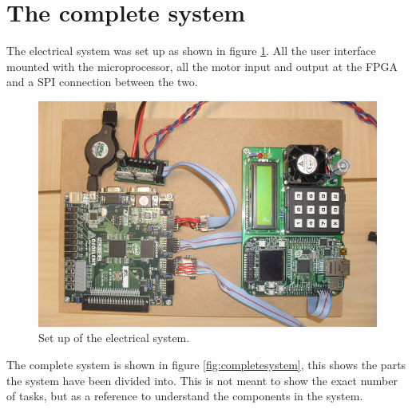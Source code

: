 \section{The complete system}

The electrical system was set up as shown in figure \ref{fig:digitalsystem}. All the user interface mounted with the microprocessor, all the motor input and output at the FPGA and a SPI connection between the two.

\begin{figure}[htb]
	\centering
	\includegraphics[scale=1,trim=0 0 0 0]{graphics/digitalsystem.png} %
	\caption{Set up of the electrical system.}
	\label{fig:digitalsystem}			%
\end{figure}


The complete system is shown in figure \ref{fig:completesystem}, this shows the parts the system have been divided into. This is not meant to show the exact number of tasks, but as a reference to understand the components in the system.


